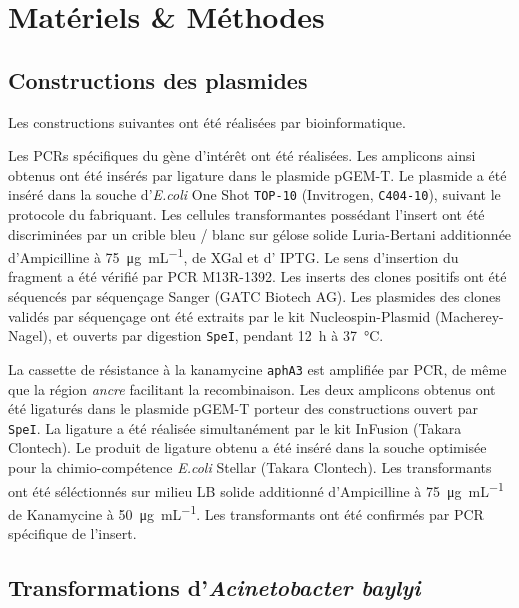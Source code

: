 
\section{Matériels \& Méthodes}
\label{sec:materiel}

\subsection{Constructions des plasmides}
\label{subsec:constructions}

Les constructions suivantes ont été réalisées par bioinformatique.

Les PCRs spécifiques du gène d'intérêt ont été réalisées. Les amplicons ainsi
obtenus ont été insérés par ligature dans le plasmide pGEM-T. Le plasmide a été
inséré dans la souche d'\textit{E.coli} One Shot\textsuperscript{{\textregistered}}
\texttt{TOP-10} (Invitrogen, \texttt{C404-10}), suivant le protocole du
fabriquant. Les cellules transformantes possédant l'insert ont été discriminées
par un crible bleu / blanc sur gélose solide Luria-Bertani additionnée
d'Ampicilline à \SI{75}{\ug\per\mL}, de XGal et d' IPTG. Le sens d'insertion du
fragment a été vérifié par PCR M13R-1392. Les inserts des clones positifs ont
été séquencés par séquençage Sanger (GATC Biotech AG). Les plasmides des clones
validés par séquençage ont été extraits par le kit Nucleospin-Plasmid
(Macherey-Nagel), et ouverts par digestion \texttt{SpeI}, pendant \si{12\hour} à
\si{37\celsius}.

La cassette de résistance à la kanamycine \texttt{aphA3} est amplifiée par PCR,
de même que la région \emph{ancre} facilitant la recombinaison. Les deux
amplicons obtenus ont été ligaturés dans le plasmide pGEM-T porteur des
constructions ouvert par \texttt{SpeI}. La ligature a été réalisée simultanément
par le kit InFusion (Takara Clontech). Le produit de ligature obtenu a été
inséré dans la souche optimisée pour la chimio-compétence \emph{E.coli} Stellar
(Takara Clontech). Les transformants ont été séléctionnés sur milieu LB solide
additionné d'Ampicilline à \SI{75}{\ug\per\mL} de Kanamycine à
\SI{50}{\ug\per\mL}. Les transformants ont été confirmés par PCR spécifique de
l'insert.

\subsection{Transformations d'\emph{Acinetobacter baylyi}}
\label{subsec:transfo}

